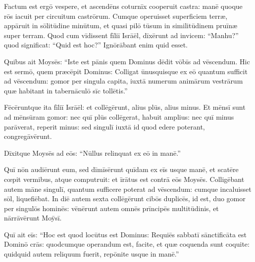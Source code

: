 Factum est ergō vespere, et ascendēns coturnīx
cooperuit castra: manē 
quoque rōs iacuit per circuitum castrōrum. Cumque operuisset superficiem
terræ, appāruit in
sōlitūdine minūtum, et quasi  pilō tūsum in
similitūdinem pruīnæ super terram. Quod
cum vīdissent fīliī Isrāēl, dīxērunt ad invicem: ``Manhu?'' quod significat: ``Quid est
hoc?'' Ignōrābant enim quid esset. 

Quibus ait Moysēs: ``Iste est pānis quem
Dominus dēdit vōbīs ad vēscendum. Hic est sermō, quem
præcēpit Dominus: Colligat ūnusquisque ex eō
quantum sufficit ad vēscendum: gomor per singula capita,
iuxtā numerum animārum vestrārum quæ habitant in
tabernāculō sīc tollētis.''

Fēcēruntque ita fīliī Isrāēl:
et collēgērunt, alius plūs, alius minus. Et mēnsī sunt
ad mēnsūram gomor: nec quī plūs collēgerat, habuit
amplius: nec quī minus parāverat, reperit minus: sed
singulī iuxtā id quod edere poterant, congregāvērunt. 

Dīxitque Moysēs ad eōs: ``Nūllus relinquat ex eō in manē.''

Quī nōn audiērunt eum, sed
dīmīsērunt quīdam ex eīs usque manē, et scatēre cœpit
vermibus, atque computruit: et īrātus est
contrā eōs Moysēs. Colligēbant autem māne singulī,
quantum sufficere poterat ad vēscendum: cumque incaluisset
sōl, liquefiēbat. In diē autem sexta collēgērunt cibōs
duplicēs, id est, duo gomor per singulōs hominēs: vēnērunt
autem omnēs prīncipēs multitūdinis, et nārrāvērunt Moȳsī. 

Quī ait eīs:
``Hoc est quod locūtus est Dominus: Requiēs sabbatī sānctificāta est Dominō crās: quodcumque operandum est, facite, et
quæ coquenda sunt coquite: quidquid autem reliquum fuerit, repōnite usque
in manē.''


